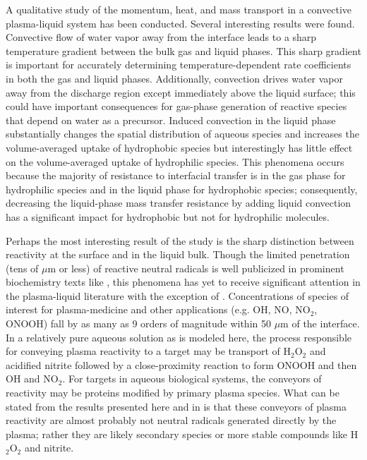 \documentclass[12pt]{article}
\begin{document}
A qualitative study of the momentum, heat, and mass transport in a convective plasma-liquid system has been conducted. Several interesting results were found. Convective flow of water vapor away from the interface leads to a sharp temperature gradient between the bulk gas and liquid phases. This sharp gradient is important for accurately determining temperature-dependent rate coefficients in both the gas and liquid phases. Additionally, convection drives water vapor away from the discharge region except immediately above the liquid surface; this could have important consequences for gas-phase generation of reactive species that depend on water as a precursor. Induced convection in the liquid phase substantially changes the spatial distribution of aqueous species and increases the volume-averaged uptake of hydrophobic species but interestingly has little effect on the volume-averaged uptake of hydrophilic species. This phenomena occurs because the majority of resistance to interfacial transfer is in the gas phase for hydrophilic species and in the liquid phase for hydrophobic species; consequently, decreasing the liquid-phase mass transfer resistance by adding liquid convection has a significant impact for hydrophobic but not for hydrophilic molecules.

Perhaps the most interesting result of the study is the sharp distinction between reactivity at the surface and in the liquid bulk. Though the limited penetration (tens of $\mu$m or less) of reactive neutral radicals is well publicized in prominent biochemistry texts like \cite{Halliwell}, this phenomena has yet to receive significant attention in the plasma-liquid literature with the exception of \cite{Chen2014a}. Concentrations of species of interest for plasma-medicine and other applications (e.g. OH, NO, NO$_2$, ONOOH) fall by as many as 9 orders of magnitude within 50 $\mu$m of the interface. In a relatively pure aqueous solution as is modeled here, the process responsible for conveying plasma reactivity to a target may be transport of H$_2$O$_2$ and acidified nitrite followed by a close-proximity reaction to form ONOOH and then OH and NO$_2$. For targets in aqueous biological systems, the conveyors of reactivity may be proteins modified by primary plasma species. What can be stated from the results presented here and in \cite{Chen2014a} is that these conveyors of plasma reactivity are almost probably not neutral radicals generated directly by the plasma; rather they are likely secondary species or more stable compounds like H$_2$O$_2$ and nitrite.    

\FloatBarrier



\end{document}
